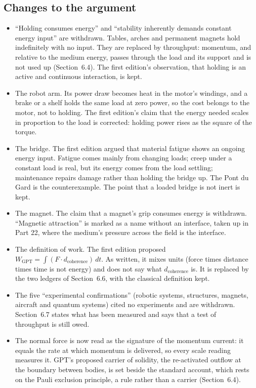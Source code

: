 \documentclass[11pt,a4paper]{article}
\begin{document}
\subsection*{Changes to the argument}
\begin{itemize}
  \item ``Holding consumes energy'' and ``stability inherently demands constant energy input'' are withdrawn. Tables, arches and permanent magnets hold indefinitely with no input. They are replaced by throughput: momentum, and relative to the medium energy, passes through the load and its support and is not used up (Section~6.4). The first edition's observation, that holding is an active and continuous interaction, is kept.
  \item The robot arm. Its power draw becomes heat in the motor's windings, and a brake or a shelf holds the same load at zero power, so the cost belongs to the motor, not to holding. The first edition's claim that the energy needed scales in proportion to the load is corrected: holding power rises as the square of the torque.
  \item The bridge. The first edition argued that material fatigue shows an ongoing energy input. Fatigue comes mainly from changing loads; creep under a constant load is real, but its energy comes from the load settling; maintenance repairs damage rather than holding the bridge up. The Pont du Gard is the counterexample. The point that a loaded bridge is not inert is kept.
  \item The magnet. The claim that a magnet's grip consumes energy is withdrawn. ``Magnetic attraction'' is marked as a name without an interface, taken up in Part 22, where the medium's pressure across the field is the interface.
  \item The definition of work. The first edition proposed $W_{\text{GPT}}=\int (F\cdot d_{\text{coherence}})\,dt$. As written, it mixes units (force times distance times time is not energy) and does not say what $d_{\text{coherence}}$ is. It is replaced by the two ledgers of Section~6.6, with the classical definition kept.
  \item The five ``experimental confirmations'' (robotic systems, structures, magnets, aircraft and quantum systems) cited no experiments and are withdrawn. Section~6.7 states what has been measured and says that a test of throughput is still owed.
  \item The normal force is now read as the signature of the momentum current: it equals the rate at which momentum is delivered, so every scale reading measures it. GPT's proposed carrier of solidity, the re-activated outflow at the boundary between bodies, is set beside the standard account, which rests on the Pauli exclusion principle, a rule rather than a carrier (Section~6.4).

\end{itemize}
\end{document}
